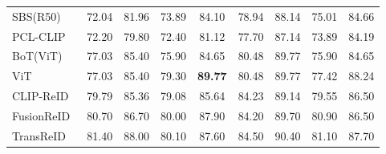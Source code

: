 \documentclass[runningheads]{llncs}
\makeatletter
\let\leaderboards@table\table
\let\leaderboards@endtable\endtable
\renewenvironment{table}[1][]{\leaderboards@table[H]}{\leaderboards@endtable}
\makeatother
\begin{document}
\begin{table}[t]
\begin{tabular}{lcccccccc}
    SBS(R50)~\cite{he2023fastreid}     & 72.04                               & 81.96                  & 73.89                   & 84.10                  & 78.94                   & 88.14                  & 75.01                   & 84.66                  \\
    \Xhline{0.6pt}
    PCL-CLIP~\cite{li2023prototypical} & 72.20                               & 79.80                  & 72.40                   & 81.12                  & 77.70                   & 87.14                  & 73.89                   & 84.19                  \\
    BoT(ViT)~\cite{luo2019bag}         & 77.03                               & 85.40                  & 75.90                   & 84.65                  & 80.48                   & 89.77                  & 75.90                   & 84.65                  \\
    ViT~\cite{dosovitskiyimage}        & 77.03                               & 85.40                  & 79.30                   & \textbf{89.77}         & 80.48                   & 89.77                  & 77.42                   & 88.24                  \\
    CLIP-ReID~\cite{li2023clip}        & 79.79                               & 85.36                  & 79.08                   & 85.64                  & 84.23                   & 89.14                  & 79.55                   & 86.50                  \\
    FusionReID~\cite{wang2025unity}    & 80.70                               & 86.70                  & 80.00                   & 87.90                  & 84.20                   & 89.70                  & 80.90                   & 86.50                  \\
    TransReID~\cite{he2021transreid}   & 81.40                               & 88.00                  & 80.10                   & 87.60                  & 84.50                   & 90.40                  & 81.10                   & 87.70                  \\

\end{tabular}
\end{table}
\end{document}
